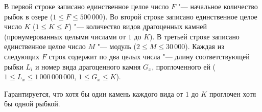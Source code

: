 В первой строке записано единственное целое число $F$ "--- начальное
количество рыбок в озере ($1 \le F \le 500\,000$). Во второй
строке записано единственное целое число $K$ ($1 \le K \le F$)
"--- количество видов драгоценных камней (пронумерованных целыми числами от
$1$ до $K$). В третьей строке записано единственное целое число $M$ "---
модуль ($2 \le M \le 30\,000$). Каждая из следующих $F$ строк
содержит по два целых числа "--- длину соответствующей рыбки $L_i$ и номер
вида драгоценного камня $G_x$, проглоченного ей
($1 \le L_x \le 1\,000\,000\,000$, $1 \le G_x \le K$).

Гарантируется, что хотя бы один камень каждого вида от $1$ до $K$ проглочен
хотя бы одной рыбкой.

